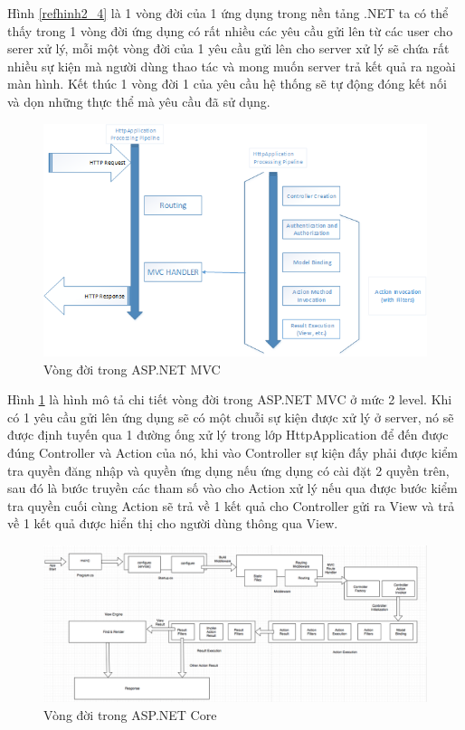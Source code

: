 \par
Hình \ref{refhinh2_4} là 1 vòng đời của 1 ứng dụng trong nền tảng .NET ta có thể thấy trong 1 vòng đời ứng dụng có rất nhiều các yêu cầu gửi lên từ các user cho serer xử lý, mỗi một vòng đời của 1 yêu cầu gửi lên cho server xử lý sẽ chứa rất nhiều sự kiện mà người dùng thao tác và mong muốn server trả kết quả ra ngoài màn hình. Kết thúc 1 vòng đời 1 của yêu cầu hệ thống sẽ tự động đóng kết nối và dọn những thực thể mà yêu cầu đã sử dụng.
\begin{center}
    \begin{figure}[h]
    \begin{center}
     \includegraphics[scale=1.0]{image/vongdoiMVCchitiet.png}
    \end{center}
    \caption{Vòng đời trong ASP.NET MVC}
    \label{refhinh2_5}
    \end{figure}
\end{center}
\par
Hình \ref{refhinh2_5} là hình mô tả chi tiết vòng đời trong ASP.NET MVC ở mức 2 level. Khi có 1 yêu cầu gửi lên ứng dụng sẽ có một chuỗi sự kiện được xử lý ở server, nó sẽ được định tuyến qua 1 đường ống xử lý trong lớp HttpApplication để đến được đúng Controller và Action của nó, khi vào Controller sự kiện đấy phải được kiểm tra quyền đăng nhập và quyền ứng dụng nếu ứng dụng có cài đặt 2 quyền trên, sau đó là bước truyền các tham số vào cho Action xử lý nếu qua được bước kiểm tra quyền cuối cùng Action sẽ trả về 1 kết quả cho Controller gửi ra View và trả về 1 kết quả được hiển thị cho người dùng thông qua View.
\begin{center}
    \begin{figure}[h]
    \begin{center}
     \includegraphics[scale=0.6]{image/vongdoiCore.png}
    \end{center}
    \caption{Vòng đời trong ASP.NET Core}
    \label{refhinh2_6}
    \end{figure}
\end{center}
